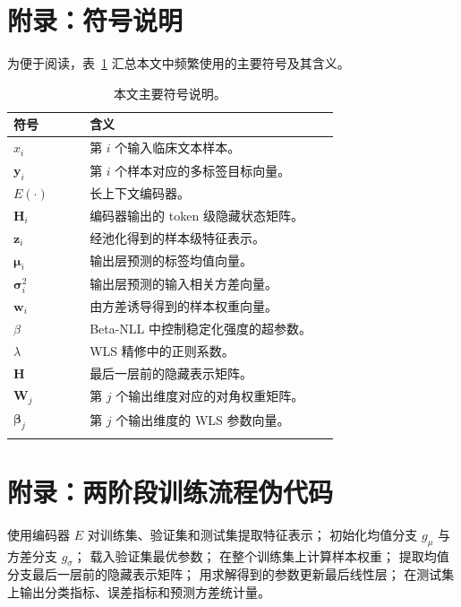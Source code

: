 \appendix

\section{附录：符号说明}
为便于阅读，表~\ref{tab:symbols} 汇总本文中频繁使用的主要符号及其含义。

\begin{longtable}{p{0.22\linewidth} p{0.72\linewidth}}
\toprule
符号 & 含义 \\
\midrule
$x_i$ & 第 $i$ 个输入临床文本样本。 \\
$\mathbf{y}_i$ & 第 $i$ 个样本对应的多标签目标向量。 \\
$E(\cdot)$ & 长上下文编码器。 \\
$\mathbf{H}_i$ & 编码器输出的 token 级隐藏状态矩阵。 \\
$\mathbf{z}_i$ & 经池化得到的样本级特征表示。 \\
$\boldsymbol{\mu}_i$ & 输出层预测的标签均值向量。 \\
$\boldsymbol{\sigma}_i^2$ & 输出层预测的输入相关方差向量。 \\
$\mathbf{w}_i$ & 由方差诱导得到的样本权重向量。 \\
$\beta$ & Beta-NLL 中控制稳定化强度的超参数。 \\
$\lambda$ & WLS 精修中的正则系数。 \\
$\mathbf{H}$ & 最后一层前的隐藏表示矩阵。 \\
$\mathbf{W}_j$ & 第 $j$ 个输出维度对应的对角权重矩阵。 \\
$\boldsymbol{\beta}_j$ & 第 $j$ 个输出维度的 WLS 参数向量。 \\
\bottomrule
\caption{本文主要符号说明。}
\label{tab:symbols}
\end{longtable}

\section{附录：两阶段训练流程伪代码}
\begin{algorithm}[H]
\caption{\method{} 的两阶段训练流程}
使用编码器 $E$ 对训练集、验证集和测试集提取特征表示；
初始化均值分支 $g_{\mu}$ 与方差分支 $g_{\sigma}$；
载入验证集最优参数；
在整个训练集上计算样本权重；
提取均值分支最后一层前的隐藏表示矩阵；
用求解得到的参数更新最后线性层；
在测试集上输出分类指标、误差指标和预测方差统计量。
\end{algorithm}

